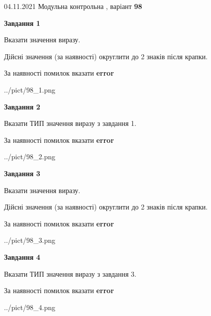 \documentclass[11pt, ukrainian]{article}
\begin{document}
{04.11.2021 Модульна контрольна , варіант  \No \textbf { 98 }\par}
{
\begin {large}
{\begin {center}\textbf{Завдання 1}\end {center}}\par
Вказати значення виразу. \par
Дійсні значення (за наявності) округлити до 2 знаків після крапки. \par
За наявності помилок вказати \textbf{error}

\begin{center}
	{../pict/98_1.png}
\end{center}
\newpage

{\begin {center}\textbf{Завдання 2}\end {center}}\par
Вказати ТИП значення виразу з завдання 1. \par
За наявності помилок вказати \textbf{error}

\begin{center}
	{../pict/98_2.png}
\end{center}
\newpage

{\begin {center}\textbf{Завдання 3}\end {center}}\par
Вказати значення виразу. \par
Дійсні значення (за наявності) округлити до 2 знаків після крапки. \par
За наявності помилок вказати \textbf{error}

\begin{center}
	{../pict/98_3.png}
\end{center}
\newpage

{\begin {center}\textbf{Завдання 4}\end {center}}\par
Вказати ТИП значення виразу з завдання 3. \par
За наявності помилок вказати \textbf{error}

\begin{center}
	{../pict/98_4.png}
\end{center}
\newpage


\end{large}}
\end{document}
